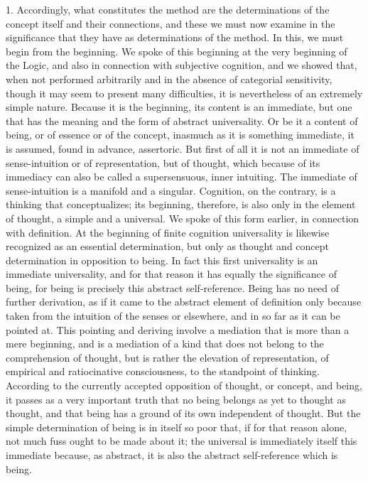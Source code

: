 
1. Accordingly, what constitutes the method are
the determinations of the concept itself and their connections,
and these we must now examine in the significance
that they have as determinations of the method.
In this, we must begin from the beginning.
We spoke of this beginning at the very beginning of the Logic,
and also in connection with subjective cognition,
and we showed that, when not performed arbitrarily
and in the absence of categorial sensitivity,
though it may seem to present many difficulties,
it is nevertheless of an extremely simple nature.
Because it is the beginning, its content is an immediate,
but one that has the meaning and the form of abstract universality.
Or be it a content of being, or of essence or of the concept,
inasmuch as it is something immediate, it is assumed,
found in advance, assertoric.
But first of all it is not an immediate of
sense-intuition or of representation,
but of thought, which because of its immediacy can
also be called a supersensuous, inner intuiting.
The immediate of sense-intuition is a manifold and a singular.
Cognition, on the contrary, is a thinking that conceptualizes;
its beginning, therefore, is also only in the element of thought,
a simple and a universal.
We spoke of this form earlier, in connection with definition.
At the beginning of finite cognition universality is likewise
recognized as an essential determination,
but only as thought and concept
determination in opposition to being.
In fact this first universality is an immediate universality,
and for that reason it has equally the significance of being,
for being is precisely this abstract self-reference.
Being has no need of further derivation,
as if it came to the abstract element of definition
only because taken from the intuition of the senses or elsewhere,
and in so far as it can be pointed at.
This pointing and deriving involve a mediation
that is more than a mere beginning,
and is a mediation of a kind that does not
belong to the comprehension of thought,
but is rather the elevation of representation,
of empirical and ratiocinative consciousness,
to the standpoint of thinking.
According to the currently accepted opposition
of thought, or concept, and being,
it passes as a very important truth that
no being belongs as yet to thought as thought,
and that being has a ground of its own independent of thought.
But the simple determination of being is in itself so poor that,
if for that reason alone, not much fuss ought to be made about it;
the universal is immediately itself this immediate
because, as abstract, it is also the
abstract self-reference which is being.

